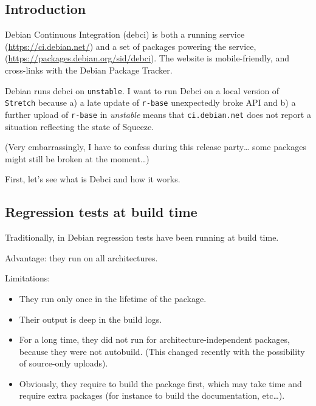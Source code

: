 \documentclass[mingoth,a4paper]{jsarticle}
\providecommand{\tightlist}{%
  \setlength{\itemsep}{0pt}\setlength{\parskip}{0pt}}
\begin{document}


\subsection{Introduction}\label{introduction}

Debian Continuous Integration (debci) is both a running service
(\url{https://ci.debian.net/}) and a set of packages powering the
service, (\url{https://packages.debian.org/sid/debci}). The website is
mobile-friendly, and cross-links with the Debian Package Tracker.

Debian runs debci on \texttt{unstable}. I want to run Debci on a local
version of \texttt{Stretch} because a) a late update of \texttt{r-base}
unexpectedly broke API and b) a further upload of \texttt{r-base} in
\emph{unstable} means that \texttt{ci.debian.net} does not report a
situation reflecting the state of Squeeze.

(Very embarrassingly, I have to confess during this release
party\ldots{} some packages might still be broken at the moment\ldots{})

First, let's see what is Debci and how it works.

\subsection{Regression tests at build
time}\label{regression-tests-at-build-time}

Traditionally, in Debian regression tests have been running at build
time.

Advantage: they run on all architectures.

Limitations:

\begin{itemize}
\tightlist
\item
  They run only once in the lifetime of the package.
\item
  Their output is deep in the build logs.
\item
  For a long time, they did not run for architecture-independent
  packages, because they were not autobuild. (This changed recently with
  the possibility of source-only uploads).
\item
  Obviously, they require to build the package first, which may take
  time and require extra packages (for instance to build the
  documentation, etc\ldots{}).
\end{itemize}
\end{document}
